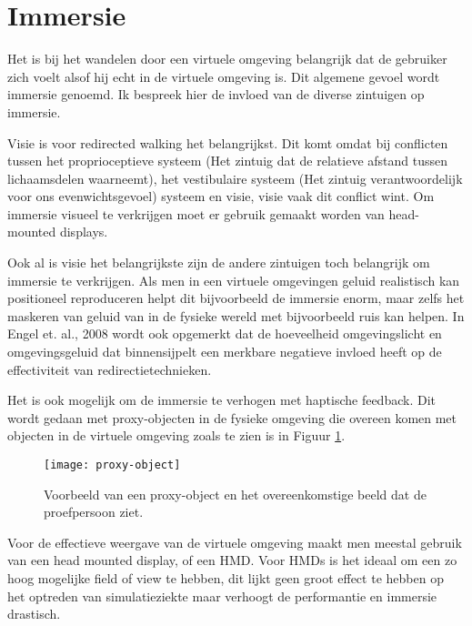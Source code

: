 \section{Immersie}
Het is bij het wandelen door een virtuele omgeving belangrijk dat de gebruiker
zich voelt alsof hij echt in de virtuele omgeving is. Dit algemene gevoel wordt
immersie genoemd. Ik bespreek hier de invloed van de diverse zintuigen op
immersie.

Visie is voor redirected walking het belangrijkst. Dit komt omdat bij conflicten
tussen het proprioceptieve systeem (Het zintuig dat de relatieve afstand tussen
lichaamsdelen waarneemt), het vestibulaire systeem (Het zintuig verantwoordelijk 
voor ons evenwichtsgevoel) systeem en visie, visie vaak dit conflict 
wint\cite{berthoz02,dichgans78,bruder08}. Om immersie visueel te verkrijgen moet 
er gebruik gemaakt worden van head-mounted displays.

Ook al is visie het belangrijkste zijn de andere zintuigen toch belangrijk om 
immersie te verkrijgen. Als men in een virtuele omgevingen geluid realistisch kan 
positioneel reproduceren helpt dit bijvoorbeeld de immersie 
enorm\cite{lackner77}, maar zelfs het maskeren van geluid van in de fysieke 
wereld met bijvoorbeeld ruis kan helpen\cite{usoh99}. In Engel et. al., 
2008\cite{engel08} wordt ook opgemerkt dat de hoeveelheid omgevingslicht en 
omgevingsgeluid dat binnensijpelt een merkbare negatieve invloed heeft op de 
effectiviteit van redirectietechnieken. 

Het is ook mogelijk om de immersie te verhogen met haptische feedback. Dit wordt
gedaan met proxy-objecten in de fysieke omgeving die overeen komen met objecten 
in de virtuele omgeving\cite{steinicke09} zoals te zien is in Figuur 
\ref{fig:proxy-object}.

\begin{figure}[t!]
    \centering
    \texttt{[image: proxy-object]}
    \caption{Voorbeeld van een proxy-object en het overeenkomstige beeld dat de
    proefpersoon ziet.\cite{steinicke09}}
    \label{fig:proxy-object}
\end{figure}

Voor de effectieve weergave van de virtuele omgeving maakt men meestal gebruik 
van een head mounted display, of een HMD. Voor HMDs is het ideaal om een zo hoog 
mogelijke field of view te hebben, dit lijkt geen groot effect te hebben op het 
optreden van simulatieziekte\cite{arthur00} maar verhoogt de performantie en 
immersie drastisch\cite{arthur00}.

